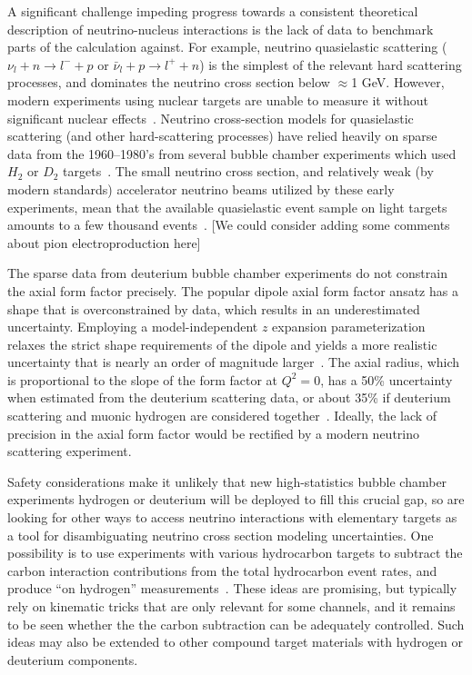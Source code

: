 A significant challenge impeding progress towards a consistent theoretical description of neutrino-nucleus interactions is the lack of data to benchmark parts of the calculation against. For example, neutrino quasielastic scattering ($\nu_{l} + n \rightarrow l^{-} + p$ or $\bar{\nu}_{l} + p \rightarrow l^{+} + n$) is the simplest of the relevant hard scattering processes, and dominates the neutrino cross section below  $\approx$1 GeV. However, modern experiments using nuclear targets are unable to measure it without significant nuclear effects~\cite{garvey_review_2014, NuSTEC:2017hzk}.
Neutrino cross-section models for quasielastic scattering (and other hard-scattering processes) have relied heavily on sparse data from the 1960--1980's from several bubble chamber experiments which used $H_{2}$ or $D_2$ targets~\cite{zeller12, ParticleDataGroup:2020ssz}.
The small neutrino cross section, and relatively weak (by modern standards) accelerator neutrino beams utilized by these early experiments, mean that the available quasielastic event sample on light targets amounts to a few thousand events~\cite{ANL_Barish_1977, BNL_Baker_1981}.
{\color{red} [We could consider adding some comments about pion electroproduction here]}

The sparse data from deuterium bubble chamber experiments do not constrain
 the axial form factor precisely.
The popular dipole axial form factor ansatz has a shape that
 is overconstrained by data, which results in an underestimated uncertainty.
Employing a model-independent $z$ expansion parameterization
 relaxes the strict shape requirements of the dipole and yields
 a more realistic uncertainty that is nearly an order of magnitude larger~\cite{Meyer:2016oeg}.
The axial radius, which is proportional to the slope of the form factor at $Q^2=0$,
 has a 50\% uncertainty when estimated from the deuterium scattering data,
 or about 35\% if deuterium scattering and muonic hydrogen are considered
 together~\cite{Hill:2017wgb}.
Ideally, the lack of precision in the axial form factor would
 be rectified by a modern neutrino scattering experiment.

Safety considerations make it unlikely that new high-statistics bubble chamber experiments 
hydrogen or deuterium will be deployed to fill this crucial gap,
so  are looking for other ways to access neutrino interactions
with elementary targets as a tool for disambiguating neutrino cross section modeling uncertainties.
One possibility is to use experiments with various hydrocarbon targets to subtract the carbon interaction contributions from
 the total hydrocarbon event rates, and produce ``on hydrogen'' measurements~\cite{PhysRevD.92.051302, PhysRevD.101.092003, Hamacher-Baumann:2020ogq, DUNE:2021tad}.
These ideas are promising, but typically rely on kinematic tricks that are only relevant for some channels, and it remains to be seen whether the  the carbon subtraction can be adequately controlled. Such ideas may also be extended to other compound target materials with hydrogen or deuterium components.

